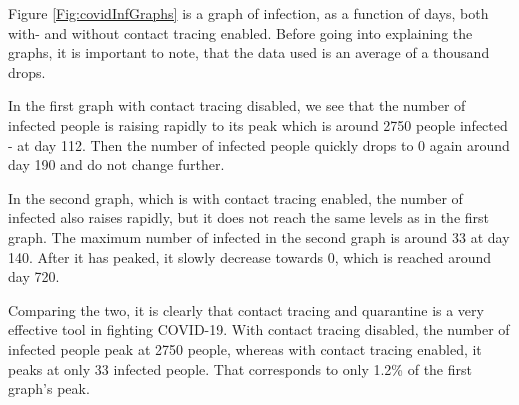 Figure \ref{Fig:covidInfGraphs} is a graph of infection, as a function of days, both with- and without contact tracing enabled. Before going into explaining the graphs, it is important to note, that the data used is an average of a thousand drops.

In the first graph with contact tracing disabled, we see that the number of infected people is raising rapidly to its peak which is around 2750 people infected - at day 112. Then the number of infected people quickly drops to 0 again around day 190 and do not change further.

In the second graph, which is with contact tracing enabled, the number of infected also raises rapidly, but it does not reach the same levels as in the first graph. The maximum number of infected in the second graph is around 33 at day 140. After it has peaked, it slowly decrease towards 0, which is reached around day 720.

Comparing the two, it is clearly that contact tracing and quarantine is a very effective tool in fighting COVID-19. With contact tracing disabled, the number of infected people peak at 2750 people, whereas with contact tracing enabled, it peaks at only 33 infected people. That corresponds to only 1.2\% of the first graph's peak.


